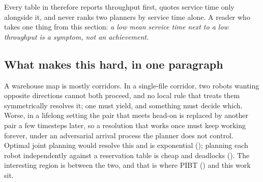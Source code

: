 \begin{caveat}
Every table in  therefore reports throughput first, quotes
service time only alongside it, and never ranks two planners by service time
alone. A reader who takes one thing from this section: \emph{a low mean service
time next to a low throughput is a symptom, not an achievement.}
\end{caveat}

\subsection{What makes this hard, in one paragraph}

A warehouse map is mostly corridors. In a single-file corridor, two robots
wanting opposite directions cannot both proceed, and no local rule that treats
them symmetrically resolves it; one must yield, and something must decide
which. Worse, in a lifelong setting the pair that meets head-on is replaced by
another pair a few timesteps later, so a resolution that works once must keep
working forever, under an adversarial arrival process the planner does not
control. Optimal joint planning would resolve this and is exponential
(); planning each robot independently against a
reservation table is cheap and deadlocks (). The
interesting region is between the two, and that is where PIBT
() and this work sit.
